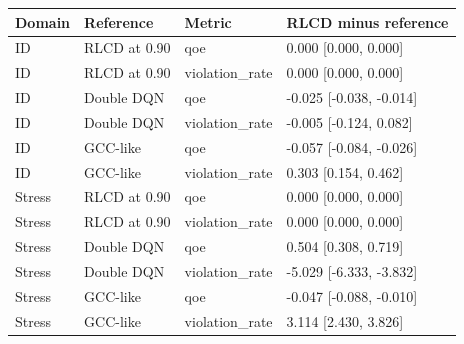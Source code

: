 \begin{tabular}{llll}
\toprule
Domain & Reference & Metric & RLCD minus reference \\
\midrule
ID & RLCD at 0.90 & qoe & 0.000 [0.000, 0.000] \\
ID & RLCD at 0.90 & violation\_rate & 0.000 [0.000, 0.000] \\
ID & Double DQN & qoe & -0.025 [-0.038, -0.014] \\
ID & Double DQN & violation\_rate & -0.005 [-0.124, 0.082] \\
ID & GCC-like & qoe & -0.057 [-0.084, -0.026] \\
ID & GCC-like & violation\_rate & 0.303 [0.154, 0.462] \\
Stress & RLCD at 0.90 & qoe & 0.000 [0.000, 0.000] \\
Stress & RLCD at 0.90 & violation\_rate & 0.000 [0.000, 0.000] \\
Stress & Double DQN & qoe & 0.504 [0.308, 0.719] \\
Stress & Double DQN & violation\_rate & -5.029 [-6.333, -3.832] \\
Stress & GCC-like & qoe & -0.047 [-0.088, -0.010] \\
Stress & GCC-like & violation\_rate & 3.114 [2.430, 3.826] \\
\bottomrule
\end{tabular}
